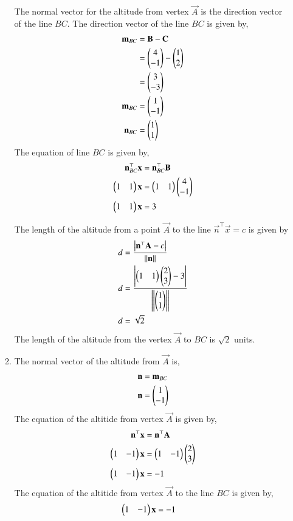 \documentclass[journal,12pt,twocolumn]{IEEEtran}
\begin{document}
\begin{enumerate}
\begin{enumerate}
The normal vector for the altitude from vertex $\vec{A}$ is the direction vector of the line $BC$. The direction vector of the line $BC$ is given by,
\begin{align}
\mathbf{m}_{BC} &= \mathbf{B} - \mathbf{C}\\
&= \begin{pmatrix}4\\-1\end{pmatrix} - \begin{pmatrix}1\\2\end{pmatrix}\\
&= \begin{pmatrix}3\\-3\end{pmatrix} \\
\mathbf{m}_{BC} &= \begin{pmatrix}1\\-1\end{pmatrix}\\
\mathbf{n}_{BC} &= \begin{pmatrix}1\\1\end{pmatrix}
\end{align}
The equation of line $BC$ is given by,
\begin{align}
{\mathbf{n}^{\top}_{BC}}\mathbf{x} &= {\mathbf{n}^{\top}_{BC}}\mathbf{B}\\
\begin{pmatrix}1&1\end{pmatrix}\mathbf{x} &= \begin{pmatrix}1&1\end{pmatrix}\begin{pmatrix}4\\-1\end{pmatrix}\\
\begin{pmatrix}1&1\end{pmatrix}\mathbf{x}  &= 3
\end{align}

The length of the altitude from a point $\vec{A}$ to the line $\vec{n}^{\top}\vec{x} = c$ is given by
\begin{align}
d &= \frac{\left\vert\mathbf{n}^{\top}\mathbf{A} - c\right\vert}{\left\lVert\mathbf{n}\right\rVert}\\
d &= \frac{\left\vert\begin{pmatrix}1&1\end{pmatrix}\begin{pmatrix}2\\3\end{pmatrix} - 3\right\vert}{\left\lVert\begin{pmatrix}1\\1\end{pmatrix}\right\rVert} \\
d &= \sqrt{2}
\end{align}
The length of the altitude from the vertex $\vec{A}$ to $BC$ is $\sqrt{2}$ units.

\item The normal vector of the altitude from $\vec{A}$ is,
\begin{align}
\mathbf{n} &= \mathbf{m}_{BC}\\
\mathbf{n} &= \begin{pmatrix}1\\-1\end{pmatrix}
\end{align}
The equation of the altitide from vertex $\vec{A}$ is given by,
\begin{align}
\mathbf{n}^{\top}\mathbf{x} &= \mathbf{n}^{\top}\mathbf{A}\\
\begin{pmatrix}1&-1\end{pmatrix}\mathbf{x} &= \begin{pmatrix}1&-1\end{pmatrix}\begin{pmatrix}2\\3\end{pmatrix}\\
\begin{pmatrix}1&-1\end{pmatrix}\mathbf{x} &= -1
\end{align}
The equation of the altitide from vertex $\vec{A}$ to the line $BC$ is given by,
\begin{align}
\begin{pmatrix}1&-1\end{pmatrix}\mathbf{x} &= -1
\end{align}
\end{enumerate}
\end{enumerate}
\end{document}
